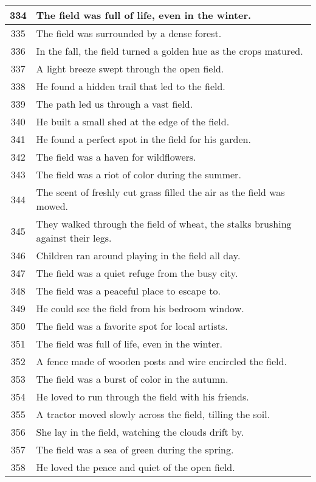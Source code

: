 \begin{longtable}{|c|p{12cm}|}
334 & The field was full of life, even in the winter. \\ \hline
335 & The field was surrounded by a dense forest. \\ \hline
336 & In the fall, the field turned a golden hue as the crops matured. \\ \hline
337 & A light breeze swept through the open field. \\ \hline
338 & He found a hidden trail that led to the field. \\ \hline
339 & The path led us through a vast field. \\ \hline
340 & He built a small shed at the edge of the field. \\ \hline
341 & He found a perfect spot in the field for his garden. \\ \hline
342 & The field was a haven for wildflowers. \\ \hline
343 & The field was a riot of color during the summer. \\ \hline
344 & The scent of freshly cut grass filled the air as the field was mowed. \\ \hline
345 & They walked through the field of wheat, the stalks brushing against their legs. \\ \hline
346 & Children ran around playing in the field all day. \\ \hline
347 & The field was a quiet refuge from the busy city. \\ \hline
348 & The field was a peaceful place to escape to. \\ \hline
349 & He could see the field from his bedroom window. \\ \hline
350 & The field was a favorite spot for local artists. \\ \hline
351 & The field was full of life, even in the winter. \\ \hline
352 & A fence made of wooden posts and wire encircled the field. \\ \hline
353 & The field was a burst of color in the autumn. \\ \hline
354 & He loved to run through the field with his friends. \\ \hline
355 & A tractor moved slowly across the field, tilling the soil. \\ \hline
356 & She lay in the field, watching the clouds drift by. \\ \hline
357 & The field was a sea of green during the spring. \\ \hline
358 & He loved the peace and quiet of the open field. \\ \hline

\end{longtable}
